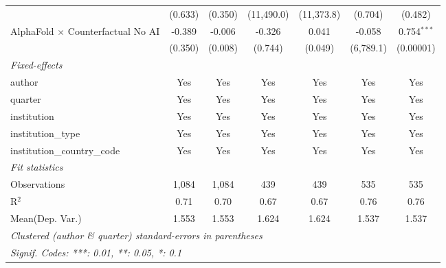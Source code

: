 \begin{tabular}{lcccccc}
                                            & (0.633)      & (0.350) & (11,490.0) & (11,373.8) & (0.704)      & (0.482)\\   
   AlphaFold $\times$ Counterfactual No AI  & -0.389       & -0.006  & -0.326     & 0.041      & -0.058       & 0.754$^{***}$\\   
                                            & (0.350)      & (0.008) & (0.744)    & (0.049)    & (6,789.1)    & (0.00001)\\   
   \midrule
   \emph{Fixed-effects}\\
   author                                   & Yes          & Yes     & Yes        & Yes        & Yes          & Yes\\  
   quarter                                  & Yes          & Yes     & Yes        & Yes        & Yes          & Yes\\  
   institution                              & Yes          & Yes     & Yes        & Yes        & Yes          & Yes\\  
   institution\_type                        & Yes          & Yes     & Yes        & Yes        & Yes          & Yes\\  
   institution\_country\_code               & Yes          & Yes     & Yes        & Yes        & Yes          & Yes\\  
   \midrule
   \emph{Fit statistics}\\
   Observations                             & 1,084        & 1,084   & 439        & 439        & 535          & 535\\  
   R$^2$                                    & 0.71         & 0.70    & 0.67       & 0.67       & 0.76         & 0.76\\  
Mean(Dep. Var.) & 1.553 & 1.553 & 1.624 & 1.624 & 1.537 & 1.537 \\
   \midrule \midrule
   \multicolumn{7}{l}{\emph{Clustered (author \& quarter) standard-errors in parentheses}}\\
   \multicolumn{7}{l}{\emph{Signif. Codes: ***: 0.01, **: 0.05, *: 0.1}}\\
\end{tabular}
\par\endgroup
